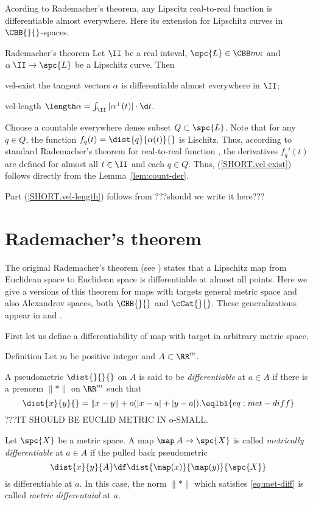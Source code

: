 Acording to Rademacher's theorem, any Lipscitz real-to-real function is differentiable almost everywhere. Here its extension for Lipschitz curves in $\CBB{}{}$-spaces.

\begin{thm}{Rademacher's theorem}\label{thm:velocity}
Let $\II$ be a real inteval, $\spc{L}\in\CBB m\kappa$
and $\alpha\:\II\to \spc{L}$ be a Lipschitz curve.
Then 

\begin{subthm}{vel-exist} the tangent vectors $\alpha$ is differentiable almost everywhere in $\II$;
\end{subthm}

\begin{subthm}{vel-length}
$\length\alpha=\int_{\II}|\alpha^\pm(t)|\cdot\d t$.
\end{subthm}

\end{thm}

Choose a countable everywhere dense subset $Q\subset \spc{L}$.
Note that for any $q\in Q$, the function $f_q(t)=\dist{q}{\alpha(t)}{}$ is Lischitz.
Thus, according to standard Rademacher's theorem for real-to-real function \cite[3.1.6]{federer}, the derivatives $f_q'(t)$ are defined for almost all $t\in\II$ and each $q\in Q$.
Thus, (\ref{SHORT.vel-exist}) follows directly from the Lemma~\ref{lem:count-der}.

Part (\ref{SHORT.vel-length}) follows from \cite[2.7.4]{BBI}
???should we write it here???
\qeds

\section{Rademacher's theorem}

The original Rademacher's theorem (see \cite[3.1.6]{federer})
states that a Lipschitz map from Euclidean space to Euclidean space is differentiable at almost all points.
Here we give a versions of this theorem for maps with targets
general metric space
and also Alexandrov spaces, both $\CBB{}{}$ and $\cCat{}{}$.
These generalizations appear in \cite{kirchheim} and \cite{lytchak:diff}.

First let us define a differentiability of map 
with target in arbitrary metric space.

\begin{thm}{Definition}
Let $m$ be positive integer and $A\subset \RR^m$.

A pseudometric $\dist{}{}{}$ on $A$ is said to be \emph{differentiable}
at $a\in A$ if there is a prenorm $\|{*}\|$ on $\RR^m$ such that
\[\dist{x}{y}{}=\|x-y\|+o(|x-a|+|y-a|).
\eqlbl{eq:met-diff}\]
???IT SHOULD BE EUCLID METRIC IN o-SMALL.

Let $\spc{X}$ be a metric space.
A map $\map\:A\to\spc{X}$ is called \emph{metrically differentiable} at $a\in A$ if the pulled back pseudometric 
\[\dist{x}{y}{A}
\df
\dist{\map(x)}{\map(y)}{\spc{X}}\]
is differentiable at $a$.
In this case, the norm $\|{*}\|$ which satisfies \ref{eq:met-diff} is called \emph{metric differentaial} at $a$.
\end{thm}

